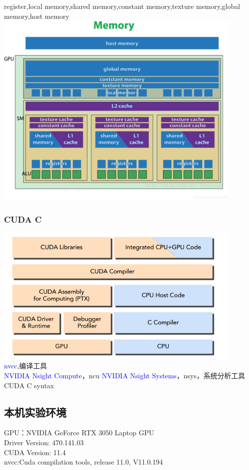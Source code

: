 register,local memory,shared memory,constant memory,texture memory,global memory,host memory\\
\includegraphics[width=0.9\textwidth]{assets/mem.jpg}\\

\subsubsection{CUDA C}
\noindent
\includegraphics[width=0.9\textwidth]{assets/cudac.png}\\
\textcolor{blue}{nvcc},编译工具\\
\textcolor{blue}{NVIDIA Nsight Compute}，ncu
\textcolor{blue}{NVIDIA Nsight Systems}，nsys，系统分析工具\\
CUDA C syntax
\subsection{本机实验环境}
\noindent
GPU：NVIDIA GeForce RTX 3050 Laptop GPU\\
Driver Version: 470.141.03   \\
CUDA Version: 11.4\\
nvcc:Cuda compilation tools, release 11.0, V11.0.194

